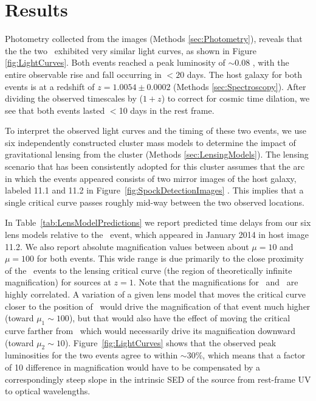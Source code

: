 \section{Results}\label{sec:Results}

Photometry collected from the \HST images (Methods
\ref{sec:Photometry}), reveals that the the two \spock\ exhibited very
similar light curves, as shown in Figure \ref{fig:LightCurves}.  Both
events reached a peak luminosity of $\sim$0.08 \microjansky, with the
entire observable rise and fall occurring in $<20$ days.  The host
galaxy for both \spock events is at a redshift of $z=1.0054\pm0.0002$
(Methods \ref{sec:Spectroscopy}).  After dividing the observed
timescales by ($1+z$) to correct for cosmic time dilation, we see that
both events lasted $<$10 days in the rest frame.

To interpret the observed light curves and the timing of these two
events, we use six independently constructed cluster mass models to
determine the impact of gravitational lensing from the 
cluster (Methods \ref{sec:LensingModels}).  The lensing scenario that
has been consistently adopted for this cluster assumes that the arc in
which the \spock events appeared consists of two mirror images of the
host galaxy, labeled 11.1 and 11.2 in
Figure~\ref{fig:SpockDetectionImages} \citep{Zitrin:2013a,
  Jauzac:2014, Johnson:2014, Richard:2014, Diego:2015a, Grillo:2015a,
  Hoag:2016, Sebesta:2016}.  This implies that a single critical curve
passes roughly mid-way between the two observed \spock locations.

In Table~\ref{tab:LensModelPredictions} we report predicted time
delays from our six lens models relative to the \spockone\ event,
which appeared in January 2014 in host image 11.2.  We also report
absolute magnification values between about $\mu=10$ and $\mu=100$ for
both events. This wide range is due primarily to the close proximity
of the \spock\ events to the lensing critical curve (the region of
theoretically infinite magnification) for sources at $z=1$.  Note that
the magnifications for \spockone\ and \spocktwo\ are highly
correlated.  A variation of a given lens model that moves the critical
curve closer to the position of \spockone\ would drive the
magnification of that event much higher (toward $\mu_1\sim100$), but
that would also have the effect of moving the critical curve farther
from \spocktwo\, which would necessarily drive its magnification
downward (toward $\mu_2\sim10$).  Figure~\ref{fig:LightCurves} shows
that the observed peak luminosities for the two events agree to within
$\sim30\%$, which means that a factor of 10 difference in
magnification would have to be compensated by a correspondingly steep
slope in the intrinsic SED of the source from rest-frame UV to optical
wavelengths.


